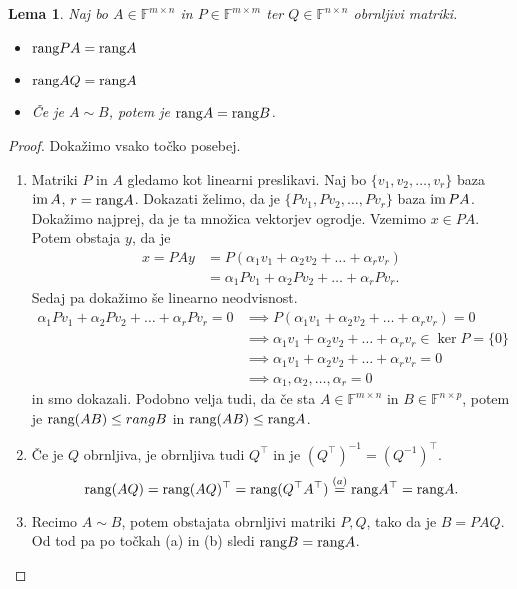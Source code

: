 \documentclass[10pt, a4paper]{article}
\newtheorem{lema}[izr]{Lema}
\newenvironment{noticeC}{%
  \tcolorbox[%
  notitle,
  empty,
  enhanced,  %
  breakable,
  coltext=black, 
  fontupper=\rmfamily,
  parbox=false,
  noparskip,
  sharp corners,
  boxrule=-1pt,  %
  frame hidden,
  left=7pt,  %
  right=7pt,
  top=5pt,
  bottom=5pt,
  before skip=2.5ex plus 2pt,
  after skip=2.5ex plus 2pt,
  overlay unbroken and last={%
  },
  ]}
{\endtcolorbox}
\newenvironment{dokaz}%
  {\begin{noticeC}\begin{proof}}%
  {\end{proof}\end{noticeC}}
\newcommand{\F}{\mathbb {F}}
\newcommand{\im}{\textup{\text{im}}\,}
\newcommand{\rang}{\textup{\text{rang}}}
\begin{document}
\begin{lema}
    Naj bo $A \in \F^{m \times n}$ in $P \in \F^{m \times m}$ ter $Q \in \F^{n \times n}$ obrnljivi matriki.
    \begin{itemize}
        \item $\rang PA = \rang A$
        \item $\rang AQ = \rang A$
        \item Če je $A \sim B$, potem je $\rang A = \rang B$. 
    \end{itemize}
\end{lema}

\begin{dokaz}
    Dokažimo vsako točko posebej. 
    \begin{enumerate}
        \item Matriki $P$ in $A$ gledamo kot linearni preslikavi.
        Naj bo $\{v_1, v_2, \dots, v_r\}$ baza $\im A$, $r = \rang A$.
        Dokazati želimo, da je $\{Pv_1, Pv_2, \dots, Pv_r\}$ baza $\im PA$.
        Dokažimo najprej, da je ta množica vektorjev ogrodje.
        Vzemimo $x \in PA$. Potem obstaja $y$, da je
        \begin{align*}
            x = PAy &= P(\alpha_1 v_1 + \alpha_2 v_2 + \dots + \alpha_r v_r)\\
            &= \alpha_1 P v_1 + \alpha_2 P v_2 + \dots + \alpha_r P v_r.
        \end{align*}
        Sedaj pa dokažimo še linearno neodvisnost.
        \begin{align*}
            \alpha_1 P v_1 + \alpha_2 P v_2 + \dots + \alpha_r P v_r = 0 &\implies P(\alpha_1 v_1 + \alpha_2 v_2 + \dots + \alpha_r v_r) = 0\\
            &\implies \alpha_1 v_1 + \alpha_2 v_2 + \dots + \alpha_r v_r \in \ker P = \{0\}\\
            &\implies \alpha_1 v_1 + \alpha_2 v_2 + \dots + \alpha_r v_r = 0\\
            &\implies \alpha_1, \alpha_2,\dots, \alpha_r = 0
        \end{align*}
        in smo dokazali.
        Podobno velja tudi, da če sta $A \in \F^{m \times n}$ in $B \in \F^{n \times p}$, potem je $\rang(AB) \leq rang B$ in $\rang (AB) \leq \rang A$.
        \item Če je $Q$ obrnljiva, je obrnljiva tudi $Q^\top$ in je $(Q^\top)^{-1} = (Q^{-1})^\top$.
        $$\rang(AQ) = \rang (AQ)^\top = \rang (Q^\top A^\top) \stackrel{(a)}{=} \rang A^\top = \rang A.$$
        \item Recimo $A \sim B$, potem obstajata obrnljivi matriki $P, Q$, tako da je $B = PAQ$.
        Od tod pa po točkah (a) in (b) sledi $\rang B = \rang A$. \qedhere
    \end{enumerate}
\end{dokaz}
\end{document}
